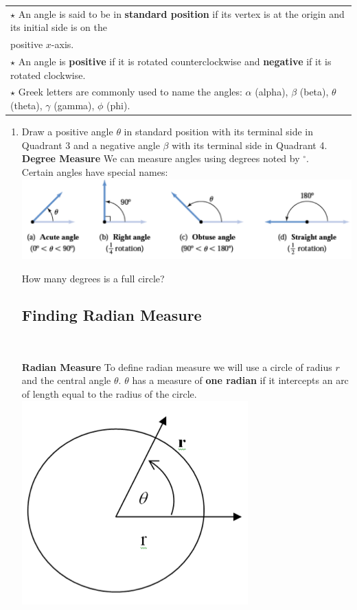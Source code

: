 \noindent \begin{tabular}{| l | }
\hline $\star$ An angle is said to be in \textbf{standard position} if its vertex is at the origin and its initial side is on the\\ positive $x$-axis.  \\
$\star$ An angle is \textbf{positive} if it is rotated counterclockwise and \textbf{negative} if it is rotated clockwise.\\
$\star$ Greek letters are commonly used to name the angles: $\alpha$ (alpha), $\beta$ (beta), $\theta$ (theta), $\gamma$ (gamma), $\phi$ (phi).  \\ \hline
\end{tabular}






\begin{enumerate}
\item Draw a positive angle $\theta$ in standard position with its terminal side in Quadrant 3 and a negative angle $\beta$ with its terminal side in Quadrant 4.\\[1in]

\newpage
\textbf{Degree Measure}  We can measure angles using degrees noted by $^\circ$.\\[1.3in]
Certain angles have special names:\\
\includegraphics[scale=.82]{anglenames}

How many degrees is a full circle?\\



\subsection{Finding Radian Measure} ~

\textbf{Radian Measure}  To define radian measure we will use a circle of radius $r$ and the central angle $\theta$.  $\theta$ has a measure of \textbf{one radian} if it intercepts an arc of length equal to the radius of the circle.\\
\includegraphics[scale=.7]{radians2}


\end{enumerate}
